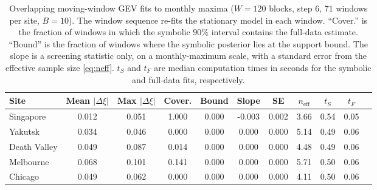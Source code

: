 \begin{table}[t]
\centering
\scriptsize
\renewcommand{\tabcolsep}{3pt}
\caption{Overlapping moving-window GEV fits to monthly maxima ($W=120$ blocks, step $6$, $71$ windows per site, $B=10$). The window sequence re-fits the stationary model in each window. ``Cover.'' is the fraction of windows in which the symbolic $90\%$ interval contains the full-data estimate. ``Bound'' is the fraction of windows where the symbolic posterior lies at the support bound. The slope is a screening statistic only, on a monthly-maximum scale, with a standard error from the effective sample size \eqref{eq:neff}. $t_S$ and $t_F$ are median computation times in seconds for the symbolic and full-data fits, respectively.}
\label{tab:app-win}
\begin{adjustbox}{max width=\textwidth}
\begin{tabular}{l *{10}{c}}
\toprule
Site & Mean $|\Delta\xi|$ & Max $|\Delta\xi|$ & Cover. & Bound & Slope & SE & $n_{\mathrm{eff}}$ & $t_S$ & $t_F$ \\
\midrule
Singapore  & 0.012 & 0.051 & 1.000 & 0.000 & -0.003 & 0.002 & 3.66 & 0.54 & 0.05 \\
Yakutsk  & 0.034 & 0.046 & 0.000 & 0.000 & 0.000 & 0.000 & 5.14 & 0.49 & 0.06 \\
Death Valley  & 0.049 & 0.087 & 0.014 & 0.000 & 0.000 & 0.000 & 4.48 & 0.49 & 0.06 \\
Melbourne  & 0.068 & 0.101 & 0.141 & 0.000 & 0.000 & 0.000 & 5.71 & 0.50 & 0.06 \\
Chicago  & 0.049 & 0.062 & 0.000 & 0.000 & 0.000 & 0.000 & 4.11 & 0.50 & 0.06 \\
\bottomrule
\end{tabular}
\end{adjustbox}
\end{table}